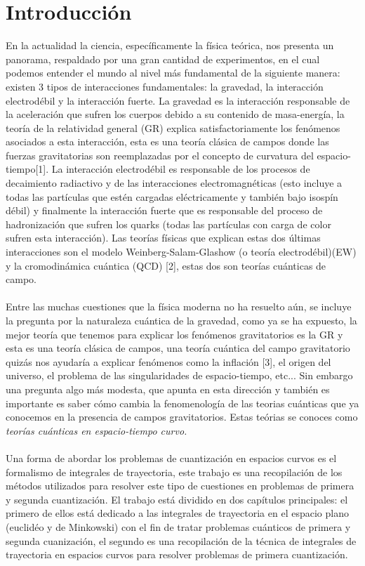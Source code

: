 \chapter{Introducción}
En la actualidad la ciencia, específicamente la física teórica, nos presenta un panorama, respaldado por una gran cantidad de experimentos, en el cual podemos entender el mundo al nivel más fundamental de la siguiente manera: existen 3 tipos de interacciones fundamentales: la gravedad, la interacción electrodébil y la interacción fuerte. La gravedad es la interacción responsable de la aceleración que sufren los cuerpos debido a su contenido de masa-energía, la teoría de la relatividad general (GR) explica satisfactoriamente los fenómenos asociados a esta interacción, esta es una teoría clásica de campos donde las fuerzas gravitatorias son reemplazadas por el concepto de curvatura del espacio-tiempo[1]. La interacción electrodébil es responsable de los procesos de decaimiento radiactivo y de las interacciones electromagnéticas (esto incluye a todas las partículas que estén cargadas eléctricamente y también bajo isospín débil) y finalmente la interacción fuerte que es responsable del proceso de hadronización que sufren los quarks (todas las partículas con carga de color sufren esta interacción). Las teorías físicas que explican estas dos últimas interacciones son el modelo Weinberg-Salam-Glashow (o teoría electrodébil)(EW) y la cromodinámica cuántica (QCD) [2], estas dos son teorías cuánticas de campo.
\\
\\
Entre las muchas cuestiones que la física moderna no ha resuelto aún, se incluye la pregunta por la naturaleza cuántica de la gravedad, como ya se ha expuesto, la mejor teoría que tenemos para explicar los fenómenos gravitatorios es la GR y esta es una teoría clásica de campos, una teoría cuántica del campo gravitatorio quizás nos ayudaría a explicar fenómenos como la inflación [3], el origen del universo, el problema de las singularidades de espacio-tiempo, etc... Sin embargo una pregunta algo más modesta, que apunta en esta dirección y también es importante es saber cómo cambia la fenomenología de las teorias cuánticas que ya conocemos en la presencia de campos gravitatorios. Estas teórias se conoces como \textit{teorías cuánticas en espacio-tiempo curvo.}
\\
\\
Una forma de abordar los problemas de cuantización en espacios curvos es el formalismo de integrales de trayectoria, este trabajo es una recopilación de los métodos utilizados para resolver este tipo de cuestiones en problemas de primera y segunda cuantización. El trabajo está dividido en dos capítulos principales: el primero de ellos está dedicado a las integrales de trayectoria en el espacio plano (euclidéo y de Minkowski) con el fin de tratar problemas cuánticos de primera y segunda cuanización, el segundo es una recopilación de la técnica de integrales de trayectoria en espacios curvos para resolver problemas de primera cuantización.
